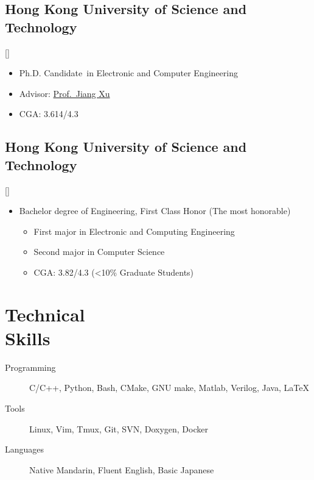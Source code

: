 \documentclass{mycv}
\begin{document}
\subsection{Hong Kong University of Science and Technology}[]
\vspace{-\parskip}%
\begin{itemize}[label={}]
	\item Ph.D. Candidate\ in Electronic and Computer Engineering 
	\item Advisor: \href{https://eexu.home.ece.ust.hk/}{Prof.~Jiang Xu}
	\item CGA: 3.614/4.3
\end{itemize}

\subsection{Hong Kong University of Science and Technology}[]
\vspace{-\parskip}%
\begin{itemize}[label={}]
	\item Bachelor degree of Engineering, First Class Honor (The most honorable)
	\begin{itemize}[label=\textbullet]
      \item First major in Electronic and Computing Engineering
      \item Second major in Computer Science
      \item CGA: 3.82/4.3 (<10\% Graduate Students)
	\end{itemize}
\end{itemize}

\section{Technical \\ Skills}

\begin{description}
	
  \item[Programming] C/C++, Python, Bash, CMake, GNU make, Matlab, Verilog, Java, \LaTeX
  \item[Tools] Linux, Vim, Tmux, Git, SVN, Doxygen, Docker %
  \item[Languages] Native Mandarin, Fluent English, Basic Japanese
\end{description}
\end{document}
